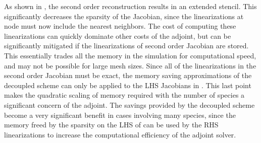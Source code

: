 As shown in , the second order
reconstruction results in an extended stencil.  This significantly decreases the
sparsity of the Jacobian, since the linearizations at node must now include the
nearest neighbors.  The cost of computing these linearizations can quickly
dominate other costs of the adjoint, but can be significantly mitigated if the
linearizations of second order Jacobian are stored.  This essentially trades all
the memory in the simulation for computational speed, and may not be possible
for large mesh sizes.  Since all of the linearizations in the second order
Jacobian must be exact, the memory saving approximations of the decoupled scheme
can only be applied to the LHS Jacobians in
.  This last point makes
the quadratic scaling of memory required with the number of species a
significant concern of the adjoint.  The savings provided by the decoupled
scheme become a very significant benefit in cases involving many species, since
the memory freed by the sparsity on the LHS of
 can be used by the RHS
linearizations to increase the computational efficiency of the adjoint solver.
